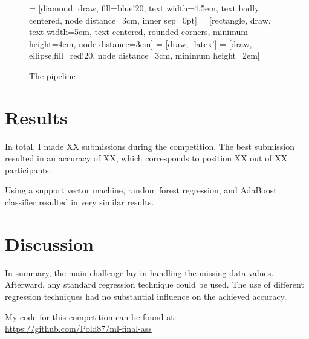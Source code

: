 \documentclass{article}
\begin{document}
\begin{figure}[h]
  \centering
 = [diamond, draw, fill=blue!20, 
    text width=4.5em, text badly centered, node distance=3cm, inner sep=0pt]
 = [rectangle, draw, 
    text width=5em, text centered, rounded corners, minimum
    height=4em, node distance=3cm]
 = [draw, -latex']
 = [draw, ellipse,fill=red!20, node distance=3cm,
    minimum height=2em]
  \caption{The pipeline}
  \label{fig:pipeline}
\end{figure}

\section{Results}
\label{sec:results}

In total, I made XX submissions during the competition. The best
submission resulted in an accuracy of XX, which corresponds to
position XX out of XX participants. 

Using a support vector machine, random forest regression, and AdaBoost
classifier resulted in very similar results. 

\section{Discussion}
\label{sec:discussion}

In summary, the main challenge lay in handling the missing data
values. Afterward, any standard regression technique could be
used. The use of different regression techniques had no substantial
influence on the achieved accuracy.

My code for this competition can be found at:\\
\url{https://github.com/Pold87/ml-final-ass}


\printbibliography
\appendix
\end{document}
